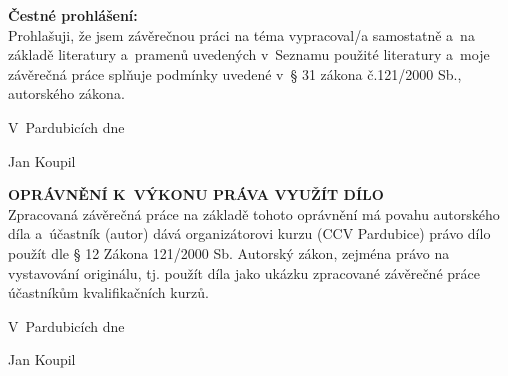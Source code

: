 





\newpage

\setcounter{page}{1}

\vspace*{\fill}

\noindent \textbf{Čestné prohlášení:} \\

Prohlašuji, že jsem závěrečnou práci na téma \textbf{\topic}
vypracoval/a samostatně a~na základě literatury a~pramenů uvedených v~Seznamu použité literatury a~moje závěrečná práce splňuje podmínky uvedené v~§ 31 zákona č.121/2000 Sb., autorského zákona.

\vspace{1cm}

\hfill V~Pardubicích dne \dotfill  
\vspace{1cm}

\hfill
Jan Koupil

\newpage

\vspace*{\fill}

\noindent \textbf{OPRÁVNĚNÍ K~VÝKONU PRÁVA VYUŽÍT DÍLO} \\

Zpracovaná závěrečná práce na základě tohoto oprávnění má povahu autorského díla a~účastník (autor) dává organizátorovi kurzu (CCV Pardubice) právo dílo použít dle § 12 Zákona 121/2000 Sb. Autorský zákon, zejména právo na vystavování originálu, tj. použít díla jako ukázku zpracované závěrečné práce účastníkům kvalifikačních kurzů.

\vspace{1cm}

\hfill V~Pardubicích dne \dotfill  

\hfill
Jan Koupil

\newpage

